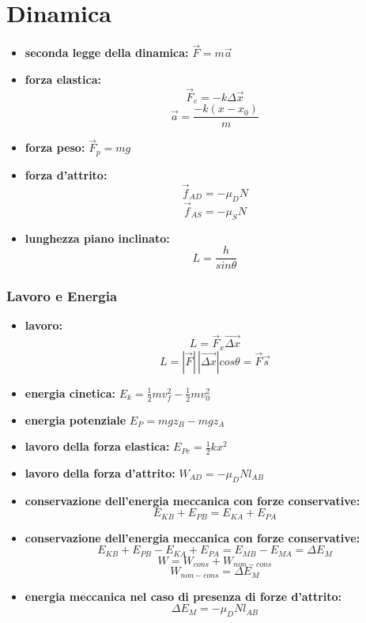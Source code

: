 \documentclass[a4paper,12pt, oneside]{book}
\begin{document}
\section{Dinamica}
\begin{itemize}
	\item \textbf{seconda legge della dinamica:} $\vec{F}=m\vec{a}$
	\item \textbf{forza elastica:}
	      $$\vec{F}_e=-k\Delta \vec{x}$$
	      $$\vec{a}=\frac{-k(x-x_0)}{m}$$
	\item \textbf{forza peso:}
	      $\vec{F}_p=mg$
	\item \textbf{forza d'attrito:}
	      $$\vec{f}_{AD}=-\mu_DN$$
	      $$\vec{f}_{AS}=-\mu_SN$$
	\item \textbf{lunghezza piano inclinato:} $$L=\frac{h}{sin\theta}$$
\end{itemize}
\subsubsection{Lavoro e Energia}
\begin{itemize}
	\item \textbf{lavoro:}
	      $$L=\vec{F}_x\vec{\Delta x}$$
	      $$L=|\vec{F}|\,|\vec{\Delta x}|cos\theta=\vec{F}\vec{s}$$
	\item \textbf{energia cinetica:}
	      $E_k=\frac{1}{2}mv_f^2-\frac{1}{2}mv_0^2$
	\item \textbf{energia potenziale}
	      $E_P=mgz_B-mgz_A$
	\item \textbf{lavoro della forza elastica:}
	      $E_{Pe}=\frac{1}{2}kx^2$
	\item \textbf{lavoro della forza d'attrito:}
	      $W_{AD}=-\mu_DNl_{AB}$
	\item \textbf{conservazione dell'energia meccanica con forze conservative:}
	      $$E_{KB}+E_{PB}=E_{KA}+E_{PA}$$
	\item \textbf{conservazione dell'energia meccanica con forze conservative:}
	      $$E_{KB}+E_{PB}-E_{KA}+E_{PA}=E_{MB}-E_{MA}=\Delta E_M$$
	      $$W=W_{cons}+W_{non-cons}$$
	      $$W_{non-cons}=\Delta E_M$$
	\item \textbf{energia meccanica nel caso di presenza di forze d'attrito:}
	      $$\Delta E_M=-\mu_DNl_{AB}$$
\end{itemize}
\end{document}
